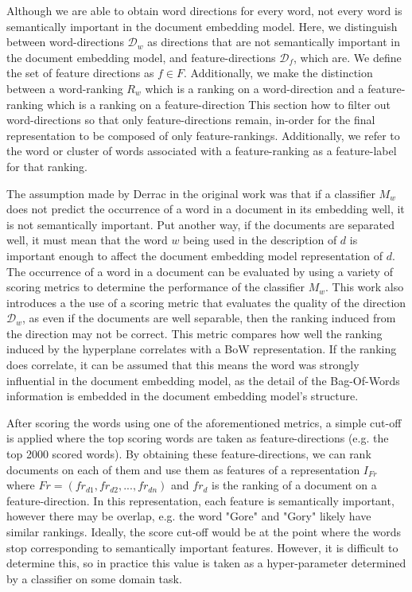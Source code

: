 Although we are able to obtain word directions for every word, not every word is semantically important in the document embedding model. Here, we distinguish between word-directions $\mathcal{D}_w$ as directions that are not semantically important in the document embedding model, and feature-directions $\mathcal{D}_f$, which are. We define the set of feature directions as $f \in F$. Additionally, we make the distinction between a word-ranking $R_w$ which is a ranking on a word-direction and a feature-ranking which is a ranking on a feature-direction  This section how to filter out word-directions so that only feature-directions remain, in-order for the final representation to be composed of only feature-rankings. Additionally, we refer to the word or cluster of words associated with a feature-ranking as a feature-label for that ranking.
 
The assumption made by Derrac in the original work \cite{Derrac2015} was that if a classifier $M_w$ does not predict the occurrence of a word in a document in its embedding well, it is not semantically important. Put another way, if the documents are separated well, it must mean that the word $w$ being used in the description of $d$ is important enough to affect the document embedding model representation of $d$. The occurrence of a word in a document can be evaluated by using a variety of scoring metrics to determine the performance of the classifier $M_w$. This work also introduces a the use of a scoring metric that evaluates the quality of the direction $\mathcal{D}_w$, as even if the documents are well separable, then the ranking induced from the direction may not be correct. This metric compares how well the ranking induced by the hyperplane correlates with a BoW representation. If the ranking does correlate, it can be assumed that this means the word was strongly influential in the document embedding model, as the detail of the Bag-Of-Words information is embedded in the document embedding model's structure. 

After scoring the words using one of the aforementioned metrics, a simple cut-off is applied where the top scoring words are taken as feature-directions (e.g. the top 2000 scored words). By obtaining these feature-directions, we can rank documents on each of them and use them as features of a  representation $I_{Fr}$ where ${Fr} = ({fr}_{d1}, {fr}_{d2}, ..., {fr}_{dn})$ and ${fr}_d$ is the ranking of a document on a feature-direction. In this representation, each feature is semantically important, however there may be overlap, e.g. the word "Gore" and "Gory" likely have similar rankings. Ideally, the score cut-off would be at the point where the words stop corresponding to semantically important features. However, it is difficult to determine this, so in practice this value is taken as a hyper-parameter determined by a classifier on some domain task.

